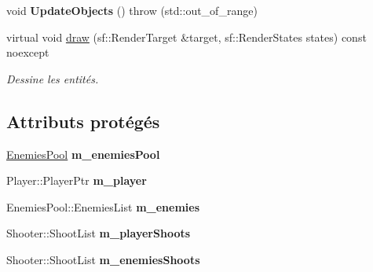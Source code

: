 \begin{DoxyCompactItemize}
\item 
\mbox{\label{classmy_1_1SchmupScene_a8f58d7114f5fff2a90b0cc9651745a14}} 
void {\bfseries Update\+Objects} ()  throw (std\+::out\+\_\+of\+\_\+range)
\item 
\mbox{\label{classmy_1_1SchmupScene_ac31669b2ef8cded3274eb06338812b11}} 
virtual void \hyperlink{classmy_1_1SchmupScene_ac31669b2ef8cded3274eb06338812b11}{draw} (sf\+::\+Render\+Target \&target, sf\+::\+Render\+States states) const noexcept
\begin{DoxyCompactList}\small\item\em Dessine les entités. \end{DoxyCompactList}\end{DoxyCompactItemize}
\subsection*{Attributs protégés}
\begin{DoxyCompactItemize}
\item 
\mbox{\label{classmy_1_1SchmupScene_adedead0f7c32ba30570d36e9d99fa6dd}} 
\hyperlink{classmy_1_1EnemiesPool}{Enemies\+Pool} {\bfseries m\+\_\+enemies\+Pool}
\item 
\mbox{\label{classmy_1_1SchmupScene_a322c62de636efb2272f75530b9f28abc}} 
Player\+::\+Player\+Ptr {\bfseries m\+\_\+player}
\item 
\mbox{\label{classmy_1_1SchmupScene_a4eafc8d5a8d22545911e3155ce8bdbd1}} 
Enemies\+Pool\+::\+Enemies\+List {\bfseries m\+\_\+enemies}
\item 
\mbox{\label{classmy_1_1SchmupScene_ad9f91bea3c07dbca83fa978aeaa711f0}} 
Shooter\+::\+Shoot\+List {\bfseries m\+\_\+player\+Shoots}
\item 
\mbox{\label{classmy_1_1SchmupScene_a7bfa7fdac07f775b59d6f88eb784d0e2}} 
Shooter\+::\+Shoot\+List {\bfseries m\+\_\+enemies\+Shoots}
\end{DoxyCompactItemize}
